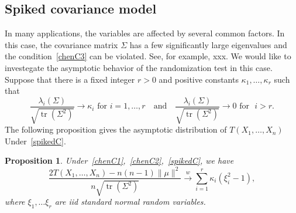 \documentclass[review]{elsarticle}
\DeclareMathOperator{\mytr}{tr}
\theoremstyle{plain}
\newtheorem{proposition}{\quad\quad Proposition}
\theoremstyle{definition}
\theoremstyle{remark}
\begin{document}
\subsection{Spiked covariance model}
In many applications, the variables are affected by several common factors.
In this case, the covariance matrix $\Sigma$ has a few significantly large eigenvalues and the condition~\eqref{chenC3} can be violated.
See, for example, xxx.
We would like to investegate the asymptotic behavior of the randomization test in this case.
Suppose that there is a fixed integer $r>0$ and positive constants $\kappa_1,\ldots,\kappa_r$ such that
\begin{equation}\label{spikedC}
    \frac{\lambda_{i}(\Sigma)}{\sqrt{\mytr(\Sigma^2)}}\to \kappa_i \text{ for } i=1,\ldots, r
    \quad
    \text{and}
    \quad
    \frac{\lambda_{i}(\Sigma)}{\sqrt{\mytr(\Sigma^2)}}\to 0 \text{ for }\,\, i> r.
\end{equation}
The following proposition gives the asymptotic distribution of $T(X_1,\ldots,X_n)$ Under~\eqref{spikedC}.
\begin{proposition}\label{prop:spiked1}
    Under~\eqref{chenC1},~\eqref{chenC2},~\eqref{spikedC},
    we have
    $$
    \frac{2T(X_1,\ldots,X_n)-n(n-1)\|\mu\|^2}{n\sqrt{\mytr(\Sigma^2)}}
    \xrightarrow{w}\sum_{i=1}^r \kappa_i (\xi_i^2-1),
    $$
    where $\xi_1,\ldots \xi_r$ are iid standard normal random variables.
\end{proposition}
\end{document}
